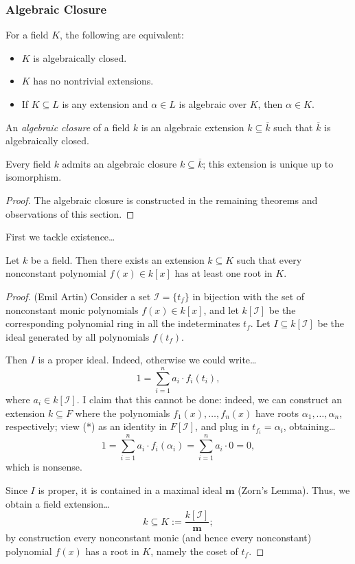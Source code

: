 \subsubsection{Algebraic Closure}\label{algebraicclosure}
\begin{lemma}
For a field $K$, the following are equivalent:
\begin{itemize}
  \item $K$ is algebraically closed.
  \item $K$ has no nontrivial extensions.
  \item If $K \subseteq L$ is any extension and $\alpha \in L$ is algebraic over $K$, then $\alpha \in K$.
\end{itemize}
\end{lemma}

\noindent An \emph{algebraic closure} of a field $k$ is an algebraic extension $k \subseteq \overline{k}$ such that
$\overline{k}$ is algebraically closed.

\begin{theorem}
Every field $k$ admits an algebraic closure $k \subseteq \overline{k}$;
this extension is unique up to isomorphism.
\end{theorem}

\begin{proof}
The algebraic closure is constructed in the remaining theorems and observations
of this section.
\end{proof}

\noindent First we tackle existence\dots

\begin{lemma}
Let $k$ be a field. Then there exists an extension $k \subseteq K$ such that
every nonconstant polynomial $f(x) \in k[x]$ has at least one root in $K$.
\end{lemma}

\begin{proof}
(Emil Artin) Consider a set $\mathcal{I} = \{ t_f \}$ in bijection with the set of nonconstant monic polynomials $f(x) \in k[x]$, and let $k[\mathcal{I}]$
be the corresponding polynomial ring in all the indeterminates $t_f$. Let $I \subseteq k[\mathcal{I}]$ be the ideal generated by all polynomials $f(t_f)$.

Then $I$ is a proper ideal. Indeed, otherwise we could write\dots
$$1 = \sum^n_{i=1} a_i \cdot f_i(t_i),\tag{*}$$
where $a_i \in k[\mathcal{I}]$. I claim that this cannot be done: indeed, we can construct an extension $k \subseteq F$ where the polynomials $f_1(x), \dots, f_n(x)$
have roots $\alpha_1, \dots, \alpha_n$, respectively; view (*) as an identity in $F[\mathcal{I}]$, and plug in $t_{f_i} = \alpha_i$, obtaining\dots
$$1 = \sum^n_{i=1} a_i \cdot f_i(\alpha_i) = \sum^n_{i=1} a_i \cdot 0 = 0,$$
which is nonsense.

Since $I$ is proper, it is contained in a maximal ideal $\textbf{m}$ (Zorn's Lemma). Thus, we obtain a field extension\dots
$$k \subseteq K := \frac{k[\mathcal{I}]}{\textbf{m}};$$
by construction every nonconstant monic (and hence every nonconstant) polynomial $f(x)$ has a root in $K$,
namely the coset of $t_f$.
\end{proof}

